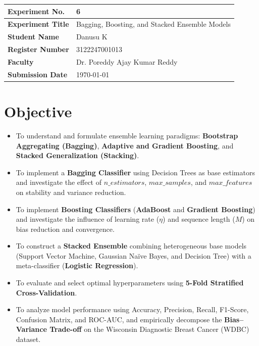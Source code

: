 \documentclass[12pt,a4paper]{article}
\begin{document}
\noindent
\begin{tabular}{|p{3.8cm}|p{11.2cm}|}
\hline
\textbf{Experiment No.} & 6 \\ \hline
\textbf{Experiment Title} & Bagging, Boosting, and Stacked Ensemble Models\footnotemark \\ \hline
\textbf{Student Name} & Danusu K \\ \hline
\textbf{Register Number} & 3122247001013 \\ \hline
\textbf{Faculty} & Dr. Poreddy Ajay Kumar Reddy \\ \hline
\textbf{Submission Date} & \today \\ \hline
\end{tabular}

\section{Objective}
\begin{itemize}
\item To understand and formulate ensemble learning paradigms: \textbf{Bootstrap Aggregating (Bagging)}, \textbf{Adaptive and Gradient Boosting}, and \textbf{Stacked Generalization (Stacking)}.
\item To implement a \textbf{Bagging Classifier} using Decision Trees as base estimators and investigate the effect of $n\_estimators$, $max\_samples$, and $max\_features$ on stability and variance reduction.
\item To implement \textbf{Boosting Classifiers} (\textbf{AdaBoost} and \textbf{Gradient Boosting}) and investigate the influence of learning rate ($\eta$) and sequence length ($M$) on bias reduction and convergence.
\item To construct a \textbf{Stacked Ensemble} combining heterogeneous base models (Support Vector Machine, Gaussian Naïve Bayes, and Decision Tree) with a meta-classifier (\textbf{Logistic Regression}).
\item To evaluate and select optimal hyperparameters using \textbf{5-Fold Stratified Cross-Validation}.
\item To analyze model performance using Accuracy, Precision, Recall, F1-Score, Confusion Matrix, and ROC-AUC, and empirically decompose the \textbf{Bias–Variance Trade-off} on the Wisconsin Diagnostic Breast Cancer (WDBC) dataset.
\end{itemize}
\end{document}
